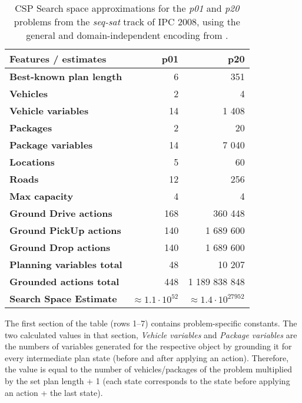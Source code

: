 {\begin{table}[tb]
\begin{center}
\begin{tabular}{l||rr}
\textbf{Features / estimates} & \textbf{p01} & \textbf{p20} \\
\midrule
\midrule
\textbf{Best-known plan length} & 6 & 351 \\
\textbf{Vehicles} & 2 & 4 \\
\textbf{Vehicle variables} & 14 & 1 408 \\
\textbf{Packages} & 2 & 20 \\
\textbf{Package variables} & 14 & 7 040 \\
\textbf{Locations} & 5 & 60 \\
\textbf{Roads} & 12 & 256 \\
\textbf{Max capacity} & 4 & 4 \\
\midrule
\textbf{Ground Drive actions} & 168 & 360 448 \\
\textbf{Ground PickUp actions} & 140 & 1 689 600 \\
\textbf{Ground Drop actions} & 140 & 1 689 600 \\
\midrule
\textbf{Planning variables total} & 48 & 10 207 \\
\textbf{Grounded actions total} & 448 & 1 189 838 848 \\
\textbf{Search Space Estimate} & $\approx 1.1 \cdot 10^{52}$ & $\approx 1.4 \cdot 10^{27 952}$ \\ %
\end{tabular}
\end{center}
\caption[Search space approximations for a na{\"{i}}ve CSP encoding.]{CSP Search space approximations for the \textit{p01} and \textit{p20} problems from the \textit{seq-sat} track of IPC 2008, using the general and domain-independent encoding from \citet[Section~8.3]{Ghallab2004}.}
\label{tab:csp-trivial}
\end{table}

The first section of the table (rows 1--7) contains problem-specific constants.
The two calculated values in that section, \textit{Vehicle variables} and \textit{Package variables} are the numbers of variables generated for the respective
object by grounding it for every intermediate plan state (before and after applying an action). Therefore, the value is equal to the number of vehicles/packages of the problem
multiplied by the set plan length + 1 (each state corresponds to the state before applying an action + the last state).

}
